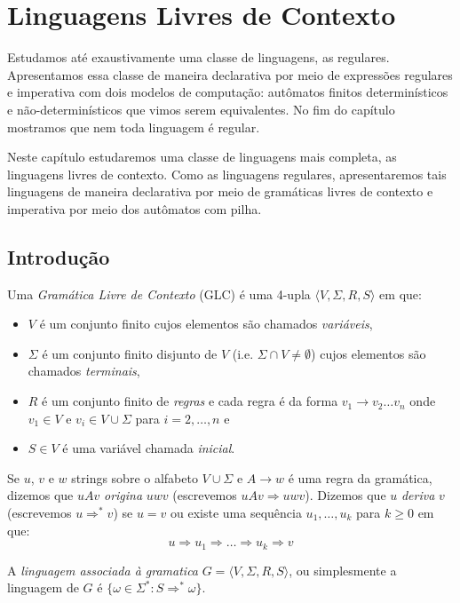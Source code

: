\chapter{Linguagens Livres de Contexto}
\label{cha:ap}

Estudamos até exaustivamente uma classe de linguagens, as regulares.
Apresentamos essa classe de maneira declarativa por meio de expressões regulares e imperativa com dois modelos de computação: autômatos finitos determinísticos e não-determinísticos que vimos serem equivalentes.
No fim do capítulo mostramos que nem toda linguagem é regular.

Neste capítulo estudaremos uma classe de linguagens mais completa, as linguagens livres de contexto.
Como as linguagens regulares, apresentaremos tais linguagens de maneira declarativa por meio de gramáticas livres de contexto e imperativa por meio dos autômatos com pilha.

\section{Introdução}
\label{sec:llc}

Uma {\em Gramática Livre de Contexto} (GLC) é uma 4-upla $\langle V, \Sigma, R, S \rangle$ em que:
\begin{itemize}
\item[] $V$ é um conjunto finito cujos elementos são chamados {\em variáveis},
\item[] $\Sigma$ é um conjunto finito disjunto de $V$ (i.e. $\Sigma \cap V \neq \emptyset$) cujos elementos são chamados {\em terminais},
\item[] $R$ é um conjunto finito de {\em regras} e cada regra é da forma $v_1 \to v_2 \dots v_n$ onde $v_1 \in V$ e $v_i \in V \cup \Sigma$ para $i = 2, \dots, n$ e
\item[] $S \in V$ é uma variável chamada {\em inicial}.   
\end{itemize}

Se $u$, $v$ e $w$ strings sobre o alfabeto $V \cup \Sigma$ e $A \to w$ é uma regra da gramática, dizemos que $uAv$ {\em origina} $uwv$ (escrevemos $uAv \Rightarrow uwv$).
Dizemos que $u$ {\em deriva} $v$ (escrevemos $u \Rightarrow^* v$) se $u = v$ ou existe uma sequência $u_1, \dots, u_k$ para $k \geq 0$ em que:
\begin{displaymath}
  u \Rightarrow u_1 \Rightarrow \dots \Rightarrow u_k \Rightarrow v
\end{displaymath}

A {\em linguagem associada à gramatica} $G = \langle V, \Sigma, R, S \rangle$, ou simplesmente a linguagem de $G$ é $\{\omega \in \Sigma^* : S \Rightarrow^* \omega \}$.

